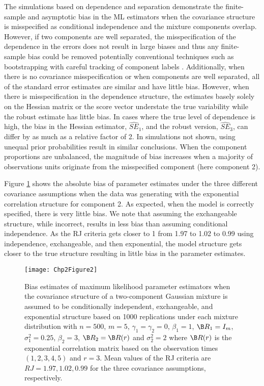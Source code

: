 The simulations based on dependence and separation demonstrate the finite-sample and asymptotic bias in the ML estimators when the covariance structure is misspecified as conditional independence and the mixture components overlap. However, if two components are well separated, the misspecification of the dependence in the errors does not result in large biases and thus any finite-sample bias could be removed potentially conventional techniques such as bootstrapping with careful tracking of component labels \cite{grun2004}. Additionally, when there is no covariance misspecification or when components are well separated, all of the standard error estimates are similar and have little bias. However, when there is misspecification in the dependence structure, the estimates basely solely on the Hessian matrix or the score vector understate the true variability while the robust estimate has little bias. In cases where the true level of dependence is high, the bias in the Hessian estimator, $\widehat{SE}_{1}$, and the robust version, $\widehat{SE}_{3}$, can differ by as much as a relative factor of 2. In simulations not shown, using unequal prior probabilities result in similar conclusions. When the component proportions are unbalanced, the magnitude of bias increases when a majority of observations units originate from the misspecified component (here component 2). 

Figure \ref{fig:2-2} shows the absolute bias of parameter estimates under the three different covariance assumptions when the data was generating with the exponential correlation structure for component 2. As expected, when the model is correctly specified, there is very little bias. We note that assuming the exchangeable structure, while incorrect, results in less bias than assuming conditional independence. As the RJ criteria gets closer to 1 from 1.97 to 1.02 to 0.99 using independence, exchangeable, and then exponential, the model structure gets closer to the true structure resulting in little bias in the parameter estimates.
\begin{figure}
\begin{center}
\texttt{[image: Chp2Figure2]}
\end{center}
\caption{Bias estimates of maximum likelihood parameter estimators when the covariance structure of a two-component Gaussian mixture is assumed to be conditionally independent, exchangeable, and exponential structure based on 1000 replications under each mixture distribution with $n=500$, $m=5$, $\gamma_1=\gamma_2=0$, $\beta_{1}=1$, $\B R_1=I_{m}$, $\sigma_1^{2}=0.25$, $\beta_2=3$, $\B R_2=\B R(r)$ and $\sigma_2^{2}=2$ where $\B R(r)$ is the exponential correlation matrix based on the observation times $(1,2,3,4,5)$ and $r=3$. Mean values of the RJ criteria are $RJ = 1.97, 1.02, 0.99$ for the three covariance assumptions, respectively.}
\label{fig:2-2}
\end{figure}

